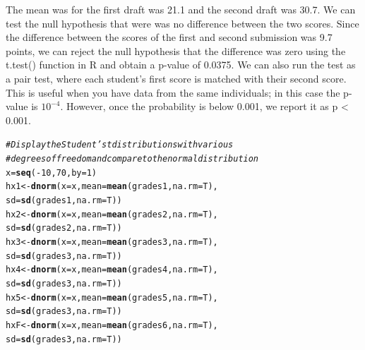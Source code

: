 \documentclass{article}\usepackage[]{graphicx}\usepackage[]{color}
\makeatletter
\newcommand{\hlnum}[1]{\textcolor[rgb]{0.686,0.059,0.569}{#1}}%
\newcommand{\hlcom}[1]{\textcolor[rgb]{0.678,0.584,0.686}{\textit{#1}}}%
\newcommand{\hlopt}[1]{\textcolor[rgb]{0,0,0}{#1}}%
\newcommand{\hlstd}[1]{\textcolor[rgb]{0.345,0.345,0.345}{#1}}%
\newcommand{\hlkwb}[1]{\textcolor[rgb]{0.69,0.353,0.396}{#1}}%
\newcommand{\hlkwc}[1]{\textcolor[rgb]{0.333,0.667,0.333}{#1}}%
\newcommand{\hlkwd}[1]{\textcolor[rgb]{0.737,0.353,0.396}{\textbf{#1}}}%
\newenvironment{kframe}{%
 \def\at@end@of@kframe{}%
 \ifinner\ifhmode%
  \def\at@end@of@kframe{\end{minipage}}%
  \begin{minipage}{\columnwidth}%
 \fi\fi%
 \def\FrameCommand##1{\hskip\@totalleftmargin \hskip-\fboxsep
 \colorbox{shadecolor}{##1}\hskip-\fboxsep
     \hskip-\linewidth \hskip-\@totalleftmargin \hskip\columnwidth}%
 \MakeFramed {\advance\hsize-\width
   \@totalleftmargin\z@ \linewidth\hsize
   \@setminipage}}%
 {\par\unskip\endMakeFramed%
 \at@end@of@kframe}
\newenvironment{knitrout}{}{} %
\makeatother
\begin{document}
The mean was for the first draft was 21.1 and the second draft was 30.7. We can test the null hypothesis that were was no difference between the two scores. Since the difference  between the scores of the first and second submission was 9.7 points, we can reject the null hypothesis that the difference was zero using the t.test() function in R and obtain a p-value of 0.0375. We can also run the test as a pair test, where each student's first score is matched with their second score. This is useful when you have data from the same individuals; in this case the p-value is \ensuremath{10^{-4}}. However, once the probability is below 0.001, we report it as p < 0.001. 

\begin{knitrout}
\color{fgcolor}\begin{kframe}
\begin{alltt}
\hlcom{# Display the Student's t distributions with various}
\hlcom{# degrees of freedom and compare to the normal distribution}
\hlstd{x} \hlkwb{=} \hlkwd{seq}\hlstd{(}\hlopt{-}\hlnum{10}\hlstd{,} \hlnum{70}\hlstd{,} \hlkwc{by} \hlstd{=} \hlnum{1}\hlstd{)}
\hlstd{hx1} \hlkwb{<-} \hlkwd{dnorm}\hlstd{(}\hlkwc{x}\hlstd{= x,} \hlkwc{mean} \hlstd{=} \hlkwd{mean}\hlstd{(grades1,} \hlkwc{na.rm}\hlstd{=T),}
             \hlkwc{sd}\hlstd{=}\hlkwd{sd}\hlstd{(grades1,} \hlkwc{na.rm}\hlstd{=T))}
\hlstd{hx2} \hlkwb{<-} \hlkwd{dnorm}\hlstd{(}\hlkwc{x}\hlstd{= x,} \hlkwc{mean} \hlstd{=} \hlkwd{mean}\hlstd{(grades2,} \hlkwc{na.rm}\hlstd{=T),}
             \hlkwc{sd}\hlstd{=} \hlkwd{sd}\hlstd{(grades2,} \hlkwc{na.rm}\hlstd{=T))}
\hlstd{hx3} \hlkwb{<-} \hlkwd{dnorm}\hlstd{(}\hlkwc{x}\hlstd{= x,} \hlkwc{mean} \hlstd{=} \hlkwd{mean}\hlstd{(grades3,} \hlkwc{na.rm}\hlstd{=T),}
             \hlkwc{sd}\hlstd{=} \hlkwd{sd}\hlstd{(grades3,} \hlkwc{na.rm}\hlstd{=T))}
\hlstd{hx4} \hlkwb{<-} \hlkwd{dnorm}\hlstd{(}\hlkwc{x}\hlstd{= x,} \hlkwc{mean} \hlstd{=} \hlkwd{mean}\hlstd{(grades4,} \hlkwc{na.rm}\hlstd{=T),}
             \hlkwc{sd}\hlstd{=} \hlkwd{sd}\hlstd{(grades3,} \hlkwc{na.rm}\hlstd{=T))}
\hlstd{hx5} \hlkwb{<-} \hlkwd{dnorm}\hlstd{(}\hlkwc{x}\hlstd{= x,} \hlkwc{mean} \hlstd{=} \hlkwd{mean}\hlstd{(grades5,} \hlkwc{na.rm}\hlstd{=T),}
             \hlkwc{sd}\hlstd{=} \hlkwd{sd}\hlstd{(grades3,} \hlkwc{na.rm}\hlstd{=T))}
\hlstd{hxF} \hlkwb{<-} \hlkwd{dnorm}\hlstd{(}\hlkwc{x}\hlstd{= x,} \hlkwc{mean} \hlstd{=} \hlkwd{mean}\hlstd{(grades6,} \hlkwc{na.rm}\hlstd{=T),}
             \hlkwc{sd}\hlstd{=} \hlkwd{sd}\hlstd{(grades3,} \hlkwc{na.rm}\hlstd{=T))}


\end{alltt}
\end{kframe}
\end{knitrout}
\end{document}
